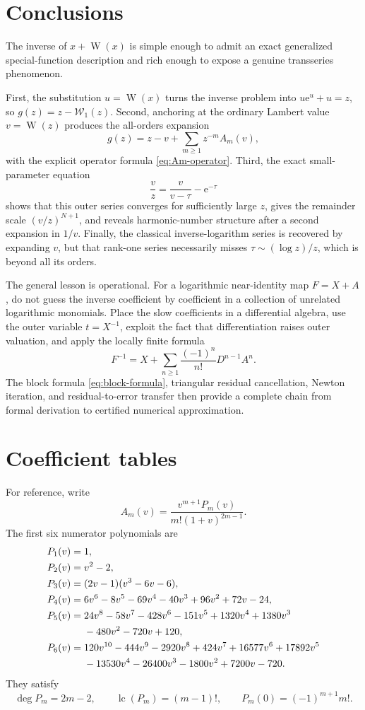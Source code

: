 \documentclass[11pt,oneside]{article}
\theoremstyle{plain}
\theoremstyle{definition}
\theoremstyle{remark}
\newcommand{\W}{\operatorname{W}}
\newcommand{\rW}{\mathcal{W}}
\newcommand{\e}{\mathrm{e}}
\begin{document}
\section{Conclusions}
\label{sec:conclusion}

The inverse of \(x+\W(x)\) is simple enough to admit an exact generalized
special-function description and rich enough to expose a genuine transseries
phenomenon.

First, the substitution \(u=\W(x)\) turns the inverse problem into
\(u\e^u+u=z\), so \(g(z)=z-\rW_1(z)\).  Second, anchoring at the ordinary
Lambert value \(v=\W(z)\) produces the all-orders expansion
\[
 g(z)=z-v+\sum_{m\ge1}z^{-m}A_m(v),
\]
with the explicit operator formula \eqref{eq:Am-operator}.  Third, the exact
small-parameter equation
\[
 \frac{v}{z}=\frac{v}{v-\tau}-\e^{-\tau}
\]
shows that this outer series converges for sufficiently large \(z\), gives the
remainder scale \((v/z)^{N+1}\), and reveals harmonic-number structure after a
second expansion in \(1/v\).  Finally, the classical inverse-logarithm series
is recovered by expanding \(v\), but that rank-one series necessarily misses
\(\tau\sim(\log z)/z\), which is beyond all its orders.

The general lesson is operational.  For a logarithmic near-identity map
\(F=X+A\), do not guess the inverse coefficient by coefficient in a collection
of unrelated logarithmic monomials.  Place the slow coefficients in a
differential algebra, use the outer variable \(t=X^{-1}\), exploit the fact
that differentiation raises outer valuation, and apply the locally finite
formula
\[
 F^{-1}=X+\sum_{n\ge1}\frac{(-1)^n}{n!}D^{n-1}A^n.
\]
The block formula \eqref{eq:block-formula}, triangular residual cancellation,
Newton iteration, and residual-to-error transfer then provide a complete chain
from formal derivation to certified numerical approximation.

\appendix

\section{Coefficient tables}
\label{app:coefficients}

For reference, write
\begin{equation}
 A_m(v)=\frac{v^{m+1}P_m(v)}{m!(1+v)^{2m-1}}.
 \label{eq:appendix-Pm}
\end{equation}
The first six numerator polynomials are
\begin{align}
 P_1(v)={}&1,\notag\\
 P_2(v)={}&v^2-2,\notag\\
 P_3(v)={}&(2v-1)(v^3-6v-6),\notag\\
 P_4(v)={}&6v^6-8v^5-69v^4-40v^3+96v^2+72v-24,\notag\\
 P_5(v)={}&24v^8-58v^7-428v^6-151v^5+1320v^4+1380v^3\notag\\
 &{}-480v^2-720v+120,\notag\\
 P_6(v)={}&120v^{10}-444v^9-2920v^8+424v^7+16577v^6+17892v^5\notag\\
 &{}-13530v^4-26400v^3-1800v^2+7200v-720.
 \label{eq:Pm-list}
\end{align}
They satisfy
\[
 \deg P_m=2m-2,
 \qquad \operatorname{lc}(P_m)=(m-1)!,
 \qquad P_m(0)=(-1)^{m+1}m!.
\]
\end{document}

